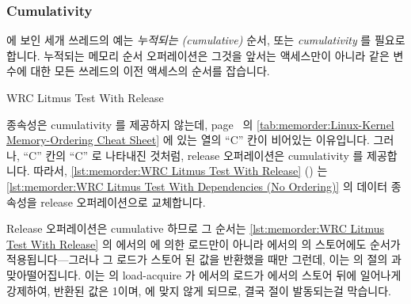 \fi

\subsubsection{Cumulativity}
\label{sec:memorder:Cumulativity}

에 보인 세개 쓰레드의 예는 \emph{누적되는 (cumulative)} 순서, 또는
\emph{cumulativity} 를 필요로 합니다.
누적되는 메모리 순서 오퍼레이션은 그것을 앞서는 액세스만이 아니라 같은 변수에
대한 모든 쓰레드의 이전 액세스의 순서를 잡습니다.

\begin{listing}[tbp]

\caption{WRC Litmus Test With Release}
\label{lst:memorder:WRC Litmus Test With Release}
\end{listing}

종속성은 cumulativity 를 제공하지 않는데,
page~\pageref{tab:memorder:Linux-Kernel Memory-Ordering Cheat Sheet} 의
\cref{tab:memorder:Linux-Kernel Memory-Ordering Cheat Sheet} 에 있는
 열의 ``C'' 칸이 비어있는 이유입니다.
그러나, ``C'' 칸의 ``C'' 로 나타내진 것처럼, release 오퍼레이션은 cumulativity
를 제공합니다.
따라서,
\cref{lst:memorder:WRC Litmus Test With Release}
()
는
\cref{lst:memorder:WRC Litmus Test With Dependencies (No Ordering)} 의 데이터
종속성을 release 오퍼레이션으로 교체합니다.
\begin{fcvref}
Release 오퍼레이션은 cumulative 하므로 그 순서는
\cref{lst:memorder:WRC Litmus Test With Release} 의  에서의
 에 의한  로드만이 아니라  에서의  의
 스토어에도 순서가 적용됩니다---그러나 그 로드가 스토어 된 값을 반환했을
때만 그런데, 이는  의  절의  과
맞아떨어집니다.
이는  의 load-acquire 가  에서의  로드가
 에서의 스토어 뒤에 일어나게 강제하여, 반환된 값은 1이며,
 에 맞지 않게 되므로, 결국  절이 발동되는걸 막습니다.
\end{fcvref}

